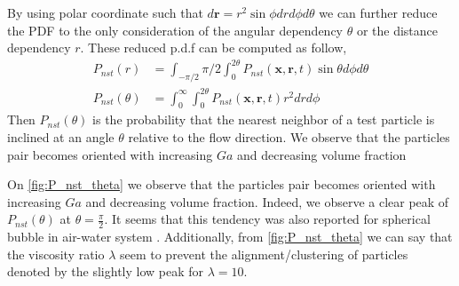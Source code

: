 By using polar coordinate such that $d \textbf{r} = r^2 \sin \phi dr d\phi d\theta$ we can further reduce the PDF to the only consideration of the angular dependency $\theta$ or the distance dependency $r$. 
These reduced p.d.f can be computed as follow, 
\begin{align*}
    P_{nst}(r) 
    &= \int_{-\pi/2}{\pi/2}\int_{0}^{2\theta} P_{nst}(\textbf{x},\textbf{r},t) \sin \theta  d\phi d\theta\\
    P_{nst}(\theta)
    &= \int_{0}^{\infty}\int_{0}^{2\theta} P_{nst}(\textbf{x},\textbf{r},t) r^2  dr d\phi
\end{align*}
Then $P_{nst}(\theta)$ is the probability that the nearest neighbor of a test particle is inclined at an angle $\theta$ relative to the flow direction. 
We observe that the particles pair becomes oriented with increasing $Ga$ and decreasing volume fraction

On \ref{fig:P_nst_theta} we observe that the particles pair becomes oriented with increasing $Ga$ and decreasing volume fraction.
Indeed, we observe a clear peak of $P_{nst}(\theta)$ at $\theta = \frac{\pi}{2}$. 
It seems that this tendency was also reported for spherical bubble in air-water system \citet{bunner2003effect}. 
Additionally, from \ref{fig:P_nst_theta} we can say that the viscosity ratio $\lambda$ seem to prevent the alignment/clustering of particles denoted by the slightly low peak for $\lambda =10$. 

